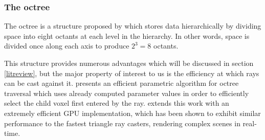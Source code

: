 \subsubsection{The octree}

The octree is a structure proposed by \cite{meagher81octree} which stores data hierarchically by dividing space into eight octants at each level in the hierarchy. In other words, space is divided once along each axis to produce $2^3 = 8$ octants.

This structure provides numerous advantages which will be discussed in section \ref{litreview}, but the major property of interest to us is the efficiency at which rays can be cast against it. \cite{revelles00anefficient} presents an efficient parametric algorithm for octree traversal which uses already computed parameter values in order to efficiently select the child voxel first entered by the ray. \cite{laine10efficientsvos} extends this work with an extremely efficient GPU implementation, which has been shown to exhibit similar performance to the fastest triangle ray casters, rendering complex scenes in real-time.
